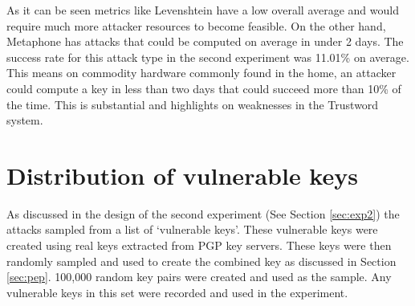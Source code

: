 \begin{table}[!h]
    \caption{Each metric's average near-collision keys}
    \label{tab:average_perm}
\end{table}

As it can be seen metrics like Levenshtein have a low overall average and would require much more attacker resources to become feasible. On the other hand, Metaphone has attacks that could be computed on average in under 2 days. The success rate for this attack type in the second experiment was 11.01\% on average. This means on commodity hardware commonly found in the home, an attacker could compute a key in less than two days that could succeed more than 10\% of the time. This is substantial and highlights on weaknesses in the Trustword system.

\section{Distribution of vulnerable keys}
\label{sec:vulnKeys}
As discussed in the design of the second experiment (See Section \ref{sec:exp2}) the attacks sampled from a list of `vulnerable keys'. These vulnerable keys were created using real keys extracted from PGP key servers. These keys were then randomly sampled and used to create the combined key as discussed in Section \ref{sec:pep}. 100,000 random key pairs were created and used as the sample. Any vulnerable keys in this set were recorded and used in the experiment.

